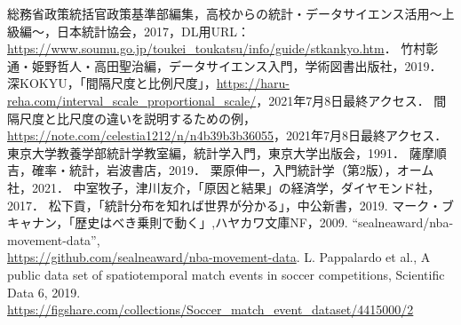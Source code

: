 %
%
%
%
%

\begin{thebibliography}{2}
総務省政策統括官政策基準部編集，高校からの統計・データサイエンス活用〜上級編〜，日本統計協会，2017，DL用URL：\url{https://www.soumu.go.jp/toukei_toukatsu/info/guide/stkankyo.htm}．
竹村彰通・姫野哲人・高田聖治編，データサイエンス入門，学術図書出版社，2019．
深KOKYU，「間隔尺度と比例尺度」，\url{https://haru-reha.com/interval_scale_proportional_scale/}，2021年7月8日最終アクセス．
間隔尺度と比尺度の違いを説明するための例，\url{https://note.com/celestia1212/n/n4b39b3b36055}，2021年7月8日最終アクセス．
東京大学教養学部統計学教室編，統計学入門，東京大学出版会，1991．
薩摩順吉，確率・統計，岩波書店，2019．
栗原伸一，入門統計学（第2版），オーム社，2021．
中室牧子，津川友介，「原因と結果」の経済学，ダイヤモンド社，2017．
松下貢，「統計分布を知れば世界が分かる」，中公新書，2019.
マーク・ブキャナン，「歴史はべき乗則で動く」,ハヤカワ文庫NF，2009.
``sealneaward/nba-movement-data'',\\ \url{https://github.com/sealneaward/nba-movement-data}.
L. Pappalardo et al., A public data set of spatiotemporal match events in soccer competitions, Scientific Data 6, 2019.\\ \url{https://figshare.com/collections/Soccer_match_event_dataset/4415000/2}
\end{thebibliography}


